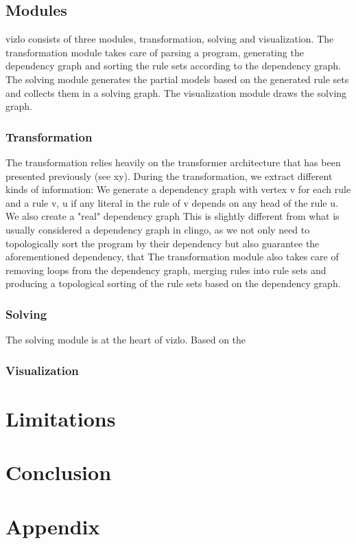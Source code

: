 \subsection{Modules}

vizlo consists of three modules, transformation, solving and visualization.
The transformation module takes care of parsing a program, generating the dependency graph and sorting the rule sets according to the dependency graph.
The solving module generates the partial models based on the generated rule sets and collects them in a solving graph.
The visualization module draws the solving graph. 

\subsubsection{Transformation}
The transformation relies heavily on the transformer architecture that has been presented previously (see xy). During the transformation, we extract different kinds of information: We generate a dependency graph with vertex v for each rule and a rule v, u if any literal in the rule of v depends on any head of the rule u. 
We also create a "real" dependency graph %
This is slightly different from what is usually considered a dependency graph in clingo, as we not only need to topologically sort the program by their dependency but also guarantee the aforementioned dependency, that %
The transformation module also takes care of removing loops from the dependency graph, merging rules into rule sets and producing a topological sorting of the rule sets based on the dependency graph.
\subsubsection{Solving}

The solving module is at the heart of vizlo. Based on the 

\subsubsection{Visualization}

\section{Limitations}

\section{Conclusion}

\section{Appendix}



